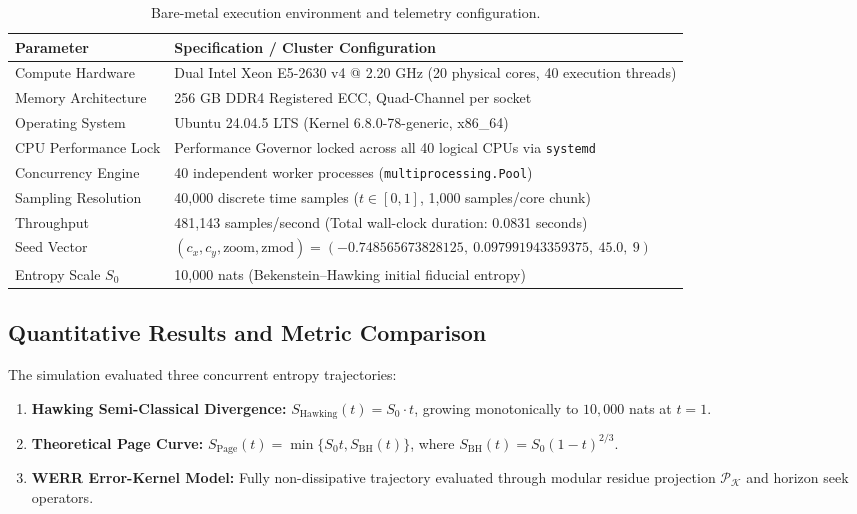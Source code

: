 \documentclass[11pt,a4paper]{article}
\begin{document}
\begin{table}[h]
\centering\small
\caption{Bare-metal execution environment and telemetry configuration.}\label{tab:setup}
\begin{tabularx}{0.96\linewidth}{@{}lX@{}}
\toprule
\textbf{Parameter} & \textbf{Specification / Cluster Configuration} \\
\midrule
Compute Hardware & Dual Intel Xeon E5-2630 v4 @ 2.20 GHz (20 physical cores, 40 execution threads) \\
Memory Architecture & 256 GB DDR4 Registered ECC, Quad-Channel per socket \\
Operating System & Ubuntu 24.04.5 LTS (Kernel 6.8.0-78-generic, x86\_64) \\
CPU Performance Lock & Performance Governor locked across all 40 logical CPUs via \texttt{systemd} \\
Concurrency Engine & 40 independent worker processes (\texttt{multiprocessing.Pool}) \\
Sampling Resolution & 40{,}000 discrete time samples ($t \in [0, 1]$, 1{,}000 samples/core chunk) \\
Throughput & 481{,}143 samples/second (Total wall-clock duration: 0.0831 seconds) \\
Seed Vector & $(c_x, c_y, \text{zoom}, \text{zmod}) = (-0.748565673828125,\ 0.097991943359375,\ 45.0,\ 9)$ \\
Entropy Scale $S_0$ & 10{,}000 nats (Bekenstein--Hawking initial fiducial entropy) \\
\bottomrule
\end{tabularx}
\end{table}

\subsection{Quantitative Results and Metric Comparison}
The simulation evaluated three concurrent entropy trajectories:
\begin{enumerate}[label=(\roman*)]
\item \textbf{Hawking Semi-Classical Divergence:} $S_{\text{Hawking}}(t) = S_0 \cdot t$, growing monotonically to $10{,}000$ nats at $t=1$.
\item \textbf{Theoretical Page Curve:} $S_{\text{Page}}(t) = \min\{S_0 t, S_{\text{BH}}(t)\}$, where $S_{\text{BH}}(t) = S_0 (1-t)^{2/3}$.
\item \textbf{WERR Error-Kernel Model:} Fully non-dissipative trajectory evaluated through modular residue projection $\mathcal{P}_{\mathcal{K}}$ and horizon seek operators.
\end{enumerate}
\end{document}
